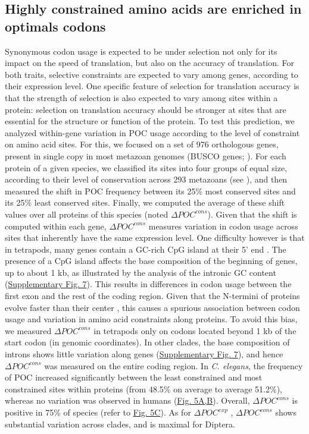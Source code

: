 \subsection{Highly constrained amino acids are enriched in optimals codons}

Synonymous codon usage is expected to be under selection not only for its impact on the speed of translation, but also on the accuracy of translation. For both traits, selective constraints are expected to vary among genes, according to their expression level. One specific feature of selection for translation accuracy is that the strength of selection is also expected to vary among sites within a protein: selection on translation accuracy should be stronger at sites that are essential for the structure or function of the protein. 
To test this prediction, we analyzed within-gene variation in POC usage according to the level of constraint on amino acid sites. For this, we focused on a set of 976 orthologous genes, present in single copy in most metazoan genomes (BUSCO genes; \citet{waterhouse_busco_2018}). For each protein of a given species, we classified its sites into four groups of equal size, according to their level of conservation across 293 metazoans (see ), and then measured the shift in POC frequency between its 25\% most conserved sites and its 25\% least conserved sites. Finally, we computed the average of these shift values over all proteins of this species (noted $\Delta POC^{cons}$). Given that the shift is computed within each gene, $\Delta POC^{cons}$ measures variation in codon usage across sites that inherently have the same expression level. 
One difficulty however is that in tetrapods, many genes contain a GC-rich CpG island at their 5' end \citep{deaton_cpg_2011}. The presence of a CpG island affects the base composition of the beginning of genes, up to about 1 kb, as illustrated by the analysis of the intronic GC content (\hyperref[suppfig:CU7]{Supplementary Fig. 7}). This results in differences in codon usage between the first exon and the rest of the coding region. Given that the N-termini of proteins evolve faster than their center \citep{bricout_evolution_2023}, this causes a spurious association between codon usage and variation in amino acid constraints along proteins. To avoid this bias, we measured $\Delta POC^{cons}$ in tetrapods only on codons located beyond 1 kb of the start codon (in genomic coordinates). In other clades, the base composition of introns shows little variation along genes (\hyperref[suppfig:CU7]{Supplementary Fig. 7}), and hence $\Delta POC^{cons}$ was measured on the entire coding region. 
In \textit{C. elegans}, the frequency of POC increased significantly between the least constrained and most constrained sites within proteins (from 48.5\% on average to average 51.2\%), whereas no variation was observed in humans (\hyperref[fig:CU5]{Fig. 5A,B}). Overall, $\Delta POC^{cons}$ is positive in 75\% of species (refer to \hyperref[fig:CU5]{Fig. 5C}). As for $\Delta POC^{exp}$ , $\Delta POC^{cons}$ shows substantial variation across clades, and is maximal for Diptera.



